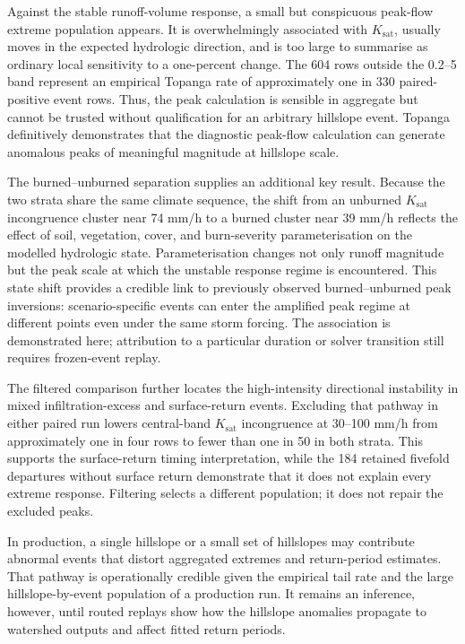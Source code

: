 \documentclass[11pt]{article}
\newcommand{\Ksat}{\ensuremath{K_{\mathrm{sat}}}}
\begin{document}
Against the stable runoff-volume response, a small but conspicuous peak-flow
extreme population appears. It is overwhelmingly associated with \Ksat{},
usually moves in the expected hydrologic direction, and is too large to
summarise as ordinary local sensitivity to a one-percent change. The 604 rows
outside the 0.2--5 band represent an empirical Topanga rate of approximately
one in 330 paired-positive event rows. Thus, the peak calculation is sensible
in aggregate but cannot be trusted without qualification for an arbitrary
hillslope event. Topanga definitively demonstrates that the diagnostic
peak-flow calculation can generate anomalous peaks of meaningful magnitude at
hillslope scale.

The burned--unburned separation supplies an additional key result. Because the
two strata share the same climate sequence, the shift from an unburned \Ksat{}
incongruence cluster near 74 mm/h to a burned cluster near 39 mm/h reflects the
effect of soil, vegetation, cover, and burn-severity parameterisation on the
modelled hydrologic state. Parameterisation changes not only runoff magnitude
but the peak scale at which the unstable response regime is encountered. This
state shift provides a credible link to previously observed burned--unburned
peak inversions: scenario-specific events can enter the amplified peak regime
at different points even under the same storm forcing. The association is
demonstrated here; attribution to a particular duration or solver transition
still requires frozen-event replay.

The filtered comparison further locates the high-intensity directional
instability in mixed infiltration-excess and surface-return events. Excluding
that pathway in either paired run lowers central-band \Ksat{} incongruence
at 30--100 mm/h from approximately one in four rows to fewer than one in
50 in both strata. This supports the surface-return timing interpretation,
while the 184 retained fivefold departures without surface return demonstrate
that it does not explain every extreme response. Filtering selects a different
population; it does not repair the excluded peaks.

In production, a single hillslope or a small set of hillslopes may contribute
abnormal events that distort aggregated extremes and return-period estimates.
That pathway is operationally credible given the empirical tail rate and the
large hillslope-by-event population of a production run. It remains an
inference, however, until routed replays show how the hillslope anomalies
propagate to watershed outputs and affect fitted return periods.
\end{document}
